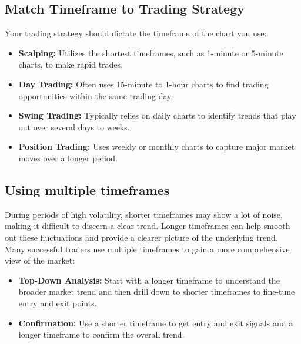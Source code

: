 \documentclass{report}
\begin{document}
     \subsection{Match Timeframe to Trading Strategy}
     \bigbreak \noindent 
     Your trading strategy should dictate the timeframe of the chart you use:
     \begin{itemize}
         \item \textbf{Scalping:} Utilizes the shortest timeframes, such as 1-minute or 5-minute charts, to make rapid trades.
         \item \textbf{Day Trading:} Often uses 15-minute to 1-hour charts to find trading opportunities within the same trading day.
         \item \textbf{Swing Trading:} Typically relies on daily charts to identify trends that play out over several days to weeks.
         \item \textbf{Position Trading:} Uses weekly or monthly charts to capture major market moves over a longer period.
     \end{itemize}

     \bigbreak \noindent 
     \subsection{Using multiple timeframes}
     \bigbreak \noindent 
     During periods of high volatility, shorter timeframes may show a lot of noise, making it difficult to discern a clear trend. Longer timeframes can help smooth out these fluctuations and provide a clearer picture of the underlying trend.
     \bigbreak \noindent 
     Many successful traders use multiple timeframes to gain a more comprehensive view of the market:
     \begin{itemize}
         \item \textbf{Top-Down Analysis:} Start with a longer timeframe to understand the broader market trend and then drill down to shorter timeframes to fine-tune entry and exit points.
         \item \textbf{Confirmation:} Use a shorter timeframe to get entry and exit signals and a longer timeframe to confirm the overall trend.
     \end{itemize}









     



     




     






    
\end{document}
